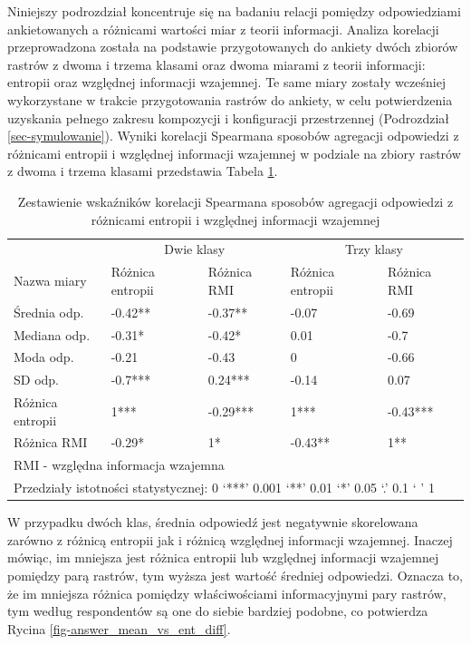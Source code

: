\documentclass{amuthesis}
\begin{document}
Niniejszy podrozdział koncentruje się na badaniu relacji pomiędzy
odpowiedziami ankietowanych a różnicami wartości miar z teorii
informacji. Analiza korelacji przeprowadzona została na podstawie
przygotowanych do ankiety dwóch zbiorów rastrów z dwoma i trzema klasami
oraz dwoma miarami z teorii informacji: entropii oraz względnej
informacji wzajemnej. Te same miary zostały wcześniej wykorzystane w
trakcie przygotowania rastrów do ankiety, w celu potwierdzenia uzyskania
pełnego zakresu kompozycji i konfiguracji przestrzennej (Podrozdział
\ref{sec-symulowanie}). Wyniki korelacji Spearmana sposobów agregacji
odpowiedzi z różnicami entropii i względnej informacji wzajemnej w
podziale na zbiory rastrów z dwoma i trzema klasami przedstawia Tabela
\ref{tbl-mc2_signif_table}.

\hypertarget{tbl-mc2_signif_table}{}
\begin{table}
\caption{\label{tbl-mc2_signif_table}Zestawienie wskaźników korelacji Spearmana sposobów agregacji odpowiedzi
z różnicami entropii i względnej informacji wzajemnej }\tabularnewline

\centering
\begin{tabular}{lllll}
\toprule
\multicolumn{1}{c}{ } & \multicolumn{2}{c}{Dwie klasy} & \multicolumn{2}{c}{Trzy klasy} \\
\cmidrule(l{3pt}r{3pt}){2-3} \cmidrule(l{3pt}r{3pt}){4-5}
Nazwa miary & Różnica entropii & Różnica RMI & Różnica entropii & Różnica RMI\\
\midrule
Średnia odp. & -0.42** & -0.37** & -0.07 & -0.69\\
Mediana odp. & -0.31* & -0.42* & 0.01 & -0.7\\
Moda odp. & -0.21 & -0.43 & 0 & -0.66\\
SD odp. & -0.7*** & 0.24*** & -0.14 & 0.07\\
Różnica entropii & 1*** & -0.29*** & 1*** & -0.43***\\
\addlinespace
Różnica RMI & -0.29* & 1* & -0.43** & 1**\\
\bottomrule
\multicolumn{5}{l}{\rule{0pt}{1em}RMI - względna informacja wzajemna}\\
\multicolumn{5}{l}{\rule{0pt}{1em}Przedziały istotności statystycznej:  0 ‘***’ 0.001 ‘**’ 0.01 ‘*’ 0.05 ‘.’ 0.1 ‘ ’ 1}\\
\end{tabular}
\end{table}

W przypadku dwóch klas, średnia odpowiedź jest negatywnie skorelowana
zarówno z różnicą entropii jak i różnicą względnej informacji wzajemnej.
Inaczej mówiąc, im mniejsza jest różnica entropii lub względnej
informacji wzajemnej pomiędzy parą rastrów, tym wyższa jest wartość
średniej odpowiedzi. Oznacza to, że im mniejsza różnica pomiędzy
właściwościami informacyjnymi pary rastrów, tym według respondentów są
one do siebie bardziej podobne, co potwierdza Rycina
\ref{fig-answer_mean_vs_ent_diff}.
\end{document}
